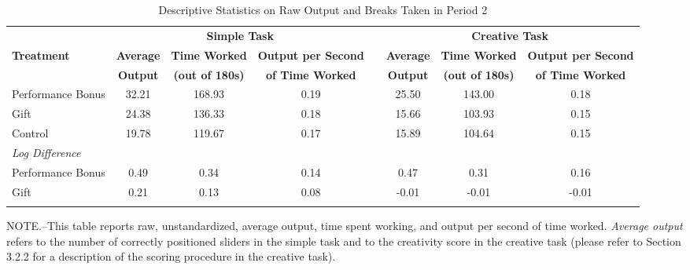 \begin{landscape}
\begin{table}[h]%
\setlength\tabcolsep{2pt}
\caption{Descriptive Statistics on Raw Output and Breaks Taken in Period 2}
\label{tab:BreaksBreakdown}
\begin{center}%
{\small\renewcommand{\arraystretch}{1}%
\begin{tabular}{lccccccc}
\hline\noalign{\smallskip}
& \multicolumn{3}{c}{\bf Simple Task} & & \multicolumn{3}{c}{\bf Creative Task} \\ \cline{2-4} \cline{6-8}
\bf Treatment & \bf \hspace{5pt} Average \hspace{5pt} & \bf Time Worked &  \hspace{5pt} \bf Output per Second  \hspace{5pt} && \bf  \hspace{5pt} Average \hspace{5pt} & \bf Time Worked & \bf  \hspace{5pt} Output per Second \hspace{5pt} \\
& \bf Output & \bf (out of 180s) & \bf of Time Worked & & \bf Output & \bf (out of 180s) & \bf of Time Worked \\
\midrule
Performance Bonus &    32.21 &   168.93 &     0.19&&    25.50&   143.00&     0.18  \\ 
Gift &    24.38 &   136.33 &     0.18&&    15.66&   103.93&     0.15  \\ 
Control &    19.78 &   119.67 &     0.17&&    15.89&   104.64&     0.15 \vspace{5pt} \\ 
 \multicolumn{3}{l}{\textit{Log Difference}} \\
\hspace{10pt} Performance Bonus &     0.49 &     0.34 &     0.14&&     0.47&     0.31&     0.16  \\ 
\hspace{10pt} Gift &     0.21 &     0.13 &     0.08&&    -0.01&    -0.01&    -0.01  \\ 
\hline\noalign{\medskip}
\end{tabular}}
\begin{minipage}{1.2\textwidth} \setlength{\parindent}{15pt}
\footnotesize NOTE.--This table reports raw, unstandardized, average output, time spent working, and output per second of time worked. 
\textit{Average output} refers to the number of correctly positioned sliders in the simple task and to the creativity score in the creative task (please refer to Section 3.2.2 for a description of the scoring procedure in the creative task). 

\end{minipage}
\end{center}
\end{table}
\end{landscape}
